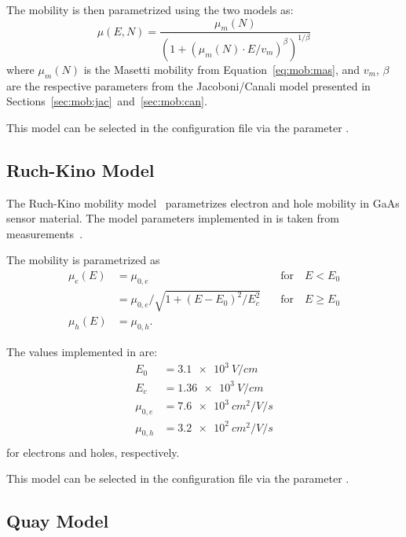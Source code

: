 The mobility is then parametrized using the two models as:
\begin{equation}
    \label{eq:mob:mascan}
    \mu (E, N) = \frac{\mu_{m}(N)}{\left(1 + \left(\mu_{m}(N) \cdot E / v_{m} \right)^{\beta} \right)^{1 / \beta}}
\end{equation}
where $\mu_{m}(N)$ is the Masetti mobility from Equation~\eqref{eq:mob:mas}, and $v_{m}$, $\beta$ are the respective parameters from the Jacoboni/Canali model presented in Sections~\ref{sec:mob:jac}~and~\ref{sec:mob:can}.

This model can be selected in the configuration file via the parameter .

\subsection{Ruch-Kino Model}

The Ruch-Kino mobility model~\cite{ruchkino} parametrizes electron and hole mobility in GaAs sensor material.
The model parameters implemented in \apsq is taken from measurements~\cite{Bergmann_2020}.

The mobility is parametrized as
\begin{align}
    \label{eq:mob:rkgaas}
    \mu_e(E) &= \mu_{0,e} &\quad \textrm{for} \quad E < E_0 \nonumber \\
             &= \mu_{0,e} / \sqrt{1 + \left(E - E_0\right)^2 / E_c^2} &\quad \textrm{for} \quad E \geq E_0 \nonumber \\
    \mu_h(E) &= \mu_{0,h}.
\end{align}

The values implemented in \apsq are:
\begin{align*}
      E_0   &= \SI{3.1e3}{V \per cm} \\
      E_c   &= \SI{1.36e3}{V \per cm} \\
      \mu_{0,e}   &= \SI{7.6e3}{cm^2 \per V \per s} \\
      \mu_{0,h}   &= \SI{3.2e2}{cm^2 \per V \per s} \\
\end{align*}
for electrons and holes, respectively.

This model can be selected in the configuration file via the parameter .


\subsection{Quay Model}

